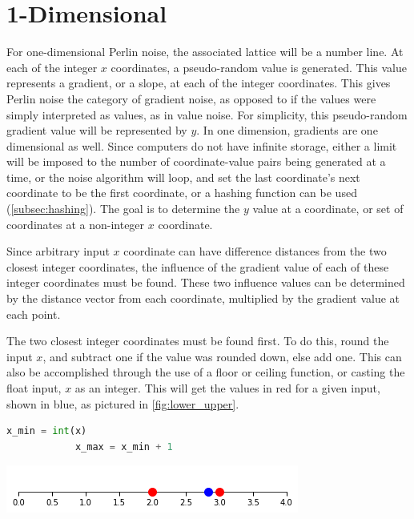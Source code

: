 \documentclass[10pt]{report}
\begin{document}
		\section{1-Dimensional} \label{sec:1d}
		
		For one-dimensional Perlin noise, the associated lattice will be a number line. At each of the integer \(x\) coordinates, a pseudo-random value is generated. This value represents a gradient, or a slope, at each of the integer coordinates. This gives Perlin noise the category of gradient noise, as opposed to if the values were simply interpreted as values, as in value noise. For simplicity, this pseudo-random gradient value will be represented by \(y\). In one dimension, gradients are one dimensional as well. Since computers do not have infinite storage, either a limit will be imposed to the number of coordinate-value pairs being generated at a time, or the noise algorithm will loop, and set the last coordinate's next coordinate to be the first coordinate, or a hashing function can be used (\ref{subsec:hashing}). The goal is to determine the \(y\) value at a coordinate, or set of coordinates at a non-integer \(x\) coordinate.
		
		Since arbitrary input \(x\) coordinate can have difference distances from the two closest integer coordinates, the influence of the gradient value of each of these integer coordinates must be found. These two influence values can be determined by the distance vector from each coordinate, multiplied by the gradient value at each point. 
		
		The two closest integer coordinates must be found first. To do this, round the input \(x\), and subtract one if the value was rounded down, else add one. This can also be accomplished through the use of a floor or ceiling function, or casting the float input, \(x\) as an integer. This will get the values in red for a given input, shown in blue, as pictured in \autoref{fig:lower_upper}.
		
		\begin{lstlisting}[label={lst:minmax}, language=Python, frame=none, caption={An example of finding the min and max bounds in 1D Perlin noise, given input x.}, captionpos=b]
			x_min = int(x)
			x_max = x_min + 1
		\end{lstlisting}
	
		\begin{minipage}{\textwidth}
			\centering
			\includegraphics[scale=0.75]{lower_upper}
			\label{fig:lower_upper}
		\end{minipage}
	
\end{document}
